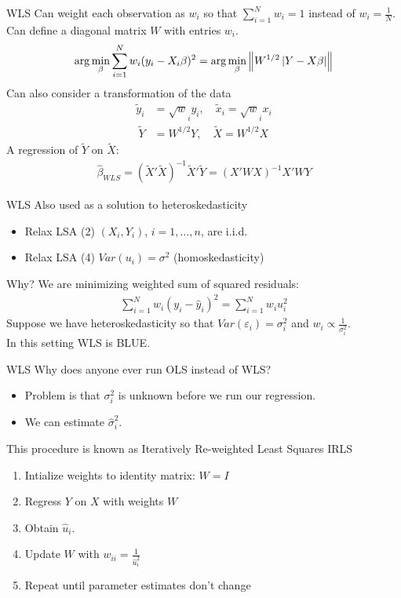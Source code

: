 \begin{frame}{WLS}
Can weight each observation as $w_i$ so that $\sum_{i=1}^N w_i = 1$ instead of $w_i=\frac{1}{N}$.\\
Can define a diagonal matrix $W$ with entries $w_i$.
\begin{align*}
\arg \min_{\beta} \sum_{i=1}^N w_i (y_i - X_i \beta)^2 = \arg \min_{\beta} \left\lVert W^{1/2} \left|Y - X \beta \right| \right\rVert 
\end{align*}
Can also consider a transformation of the data 
\begin{align*}
\tilde{y}_i &= \sqrt{w}_i y_i , \quad  \tilde{x}_i = \sqrt{w}_i x_i \\\
\tilde{Y} &= W^{1/2} Y, \quad  \tilde{X} = W^{1/2} X
\end{align*}
A regression of $\tilde{Y}$ on $\tilde{X}$:
\begin{align*}
\widehat{\beta}_{WLS} = (\tilde{X}'\tilde{X})^{-1}\tilde{X}'\tilde{Y} = (X' W X)^{-1} X' W Y
\end{align*}
\end{frame}

\begin{frame}{WLS}
Also used as a solution to heteroskedasticity
\begin{itemize}
    \item Relax LSA (2) $(X_i,Y_i)$, $i =1,\ldots,n$, are i.i.d.
    \item Relax LSA (4) $Var(u_i) = \sigma^2$ (homoskedasticity)
\end{itemize}
Why? We are minimizing weighted sum of squared residuals:
\begin{align*}
\sum_{i=1}^N w_i (y_i - \hat{y}_i)^2 = \sum_{i=1}^N w_i u_i^2 
\end{align*}
Suppose we have heteroskedasticity so that $Var(\varepsilon_i) = \sigma_i^2$ and $w_i \propto \frac{1}{\sigma_i^2}$.\\
In this setting WLS is \alert{BLUE}.
\end{frame}

\begin{frame}{WLS}
Why does anyone ever run OLS instead of WLS?
\begin{itemize}
\item Problem is that $\sigma_i^2$ is unknown before we run our regression.
\item We can estimate $\widehat{\sigma}_i^2$.
\end{itemize}
This procedure is known as Iteratively Re-weighted Least Squares \alert{IRLS}
\begin{enumerate}
\item Intialize weights to identity matrix: $W = I$
\item Regress $Y$ on $X$ with weights $W$
\item Obtain $\widehat{u}_i$.
\item Update $W$ with $w_{ii} = \frac{1}{\widehat{u}_i^2}$
\item Repeat until parameter estimates don't change
\end{enumerate}
\end{frame}



